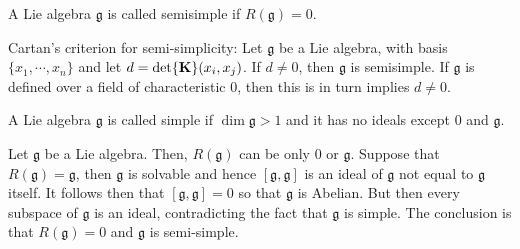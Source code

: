 \documentclass{homework}
\begin{document}
\begin{df}
A Lie algebra $\mathfrak{g}$ is called semisimple if $R(\mathfrak{g}) = 0$. 
\end{df}

\begin{df} Cartan's criterion for semi-simplicity: 
Let $\mathfrak{g}$ be a Lie algebra, with basis $\{x_1, \cdots, x_n\}$ and let $d = \det {\bf K}(x_i, x_j)$. If $d \neq 0$, then $\mathfrak{g}$ is semisimple. If $\mathfrak{g}$ is defined over a field of characteristic 0, then this is in turn implies $d \neq 0$. 
\end{df}

\begin{df}
A Lie algebra $\mathfrak{g}$ is called simple if $\dim \mathfrak{g} > 1$ and it has no ideals except $0$ and $\mathfrak{g}$. 
\end{df}

Let $\mathfrak{g}$ be a Lie algebra. Then, $R(\mathfrak{g})$ can be only 0 or $\mathfrak{g}$. Suppose that $R(\mathfrak{g}) = \mathfrak{g}$, then $\mathfrak{g}$ is solvable and hence $[\mathfrak{g}, \mathfrak{g}]$ is an ideal of $\mathfrak{g}$ not equal to $\mathfrak{g}$ itself. It follows then that $[\mathfrak{g}, \mathfrak{g}] = 0$ so that $\mathfrak{g}$ is Abelian. But then every subspace of $\mathfrak{g}$ is an ideal, contradicting the fact that $\mathfrak{g}$ is simple. The conclusion is that $R(\mathfrak{g}) = 0$ and $\mathfrak{g}$ is semi-simple. 
\end{document}
